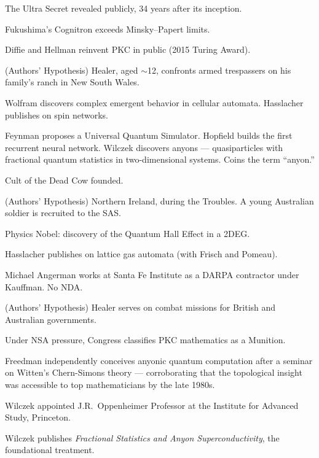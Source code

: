 \begin{description}[style=nextline, leftmargin=3.5cm, labelwidth=3cm]
\item[1974] The Ultra Secret revealed publicly, 34 years after its inception.

\item[1975] Fukushima's Cognitron exceeds Minsky--Papert limits.

\item[1976] Diffie and Hellman reinvent PKC in public (2015 Turing Award).

\item[$\sim$1977] (Authors' Hypothesis) Healer, aged $\sim$12, confronts armed trespassers on his family's ranch in New South Wales.

\item[1981] Wolfram discovers complex emergent behavior in cellular automata. Hasslacher publishes on spin networks.

\item[1982] Feynman proposes a Universal Quantum Simulator. Hopfield builds the first recurrent neural network. Wilczek discovers anyons --- quasiparticles with fractional quantum statistics in two-dimensional systems. Coins the term ``anyon.''

\item[1984] Cult of the Dead Cow founded.

\item[$\sim$1985] (Authors' Hypothesis) Northern Ireland, during the Troubles. A young Australian soldier is recruited to the SAS.

\item[1985] Physics Nobel: discovery of the Quantum Hall Effect in a 2DEG.

\item[1986] Hasslacher publishes on lattice gas automata (with Frisch and Pomeau).

\item[$\sim$1986--1995] Michael Angerman works at Santa Fe Institute as a DARPA contractor under Kauffman. No NDA.

\item[$\sim$1987--1990] (Authors' Hypothesis) Healer serves on combat missions for British and Australian governments.

\item[1988] Under NSA pressure, Congress classifies PKC mathematics as a Munition.

\item[1988] Freedman independently conceives anyonic quantum computation after a seminar on Witten's Chern-Simons theory --- corroborating that the topological insight was accessible to top mathematicians by the late 1980s.

\item[1989] Wilczek appointed J.R.\ Oppenheimer Professor at the Institute for Advanced Study, Princeton.

\item[1990] Wilczek publishes \textit{Fractional Statistics and Anyon Superconductivity}, the foundational treatment.

\end{description}


